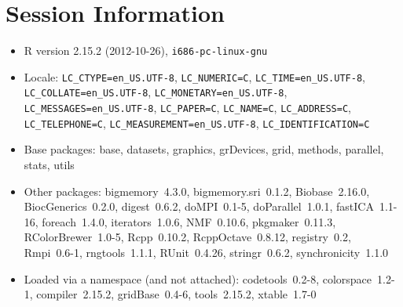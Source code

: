\documentclass[10pt]{article}
\begin{document}
\section*{Session Information}
\begin{itemize}\raggedright
  \item R version 2.15.2 (2012-10-26), \verb|i686-pc-linux-gnu|
  \item Locale: \verb|LC_CTYPE=en_US.UTF-8|, \verb|LC_NUMERIC=C|, \verb|LC_TIME=en_US.UTF-8|, \verb|LC_COLLATE=en_US.UTF-8|, \verb|LC_MONETARY=en_US.UTF-8|, \verb|LC_MESSAGES=en_US.UTF-8|, \verb|LC_PAPER=C|, \verb|LC_NAME=C|, \verb|LC_ADDRESS=C|, \verb|LC_TELEPHONE=C|, \verb|LC_MEASUREMENT=en_US.UTF-8|, \verb|LC_IDENTIFICATION=C|
  \item Base packages: base, datasets, graphics, grDevices, grid,
    methods, parallel, stats, utils
  \item Other packages: bigmemory~4.3.0, bigmemory.sri~0.1.2,
    Biobase~2.16.0, BiocGenerics~0.2.0, digest~0.6.2, doMPI~0.1-5,
    doParallel~1.0.1, fastICA~1.1-16, foreach~1.4.0, iterators~1.0.6,
    NMF~0.10.6, pkgmaker~0.11.3, RColorBrewer~1.0-5, Rcpp~0.10.2,
    RcppOctave~0.8.12, registry~0.2, Rmpi~0.6-1, rngtools~1.1.1,
    RUnit~0.4.26, stringr~0.6.2, synchronicity~1.1.0
  \item Loaded via a namespace (and not attached): codetools~0.2-8,
    colorspace~1.2-1, compiler~2.15.2, gridBase~0.4-6, tools~2.15.2,
    xtable~1.7-0
\end{itemize}
\end{document}
